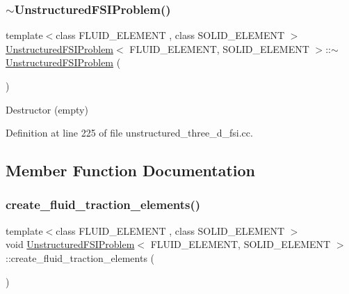 \subsubsection{\texorpdfstring{$\sim$\+Unstructured\+F\+S\+I\+Problem()}{~UnstructuredFSIProblem()}}
{\footnotesize\ttfamily template$<$class F\+L\+U\+I\+D\+\_\+\+E\+L\+E\+M\+E\+NT , class S\+O\+L\+I\+D\+\_\+\+E\+L\+E\+M\+E\+NT $>$ \\
\hyperlink{classUnstructuredFSIProblem}{Unstructured\+F\+S\+I\+Problem}$<$ F\+L\+U\+I\+D\+\_\+\+E\+L\+E\+M\+E\+NT, S\+O\+L\+I\+D\+\_\+\+E\+L\+E\+M\+E\+NT $>$\+::$\sim$\hyperlink{classUnstructuredFSIProblem}{Unstructured\+F\+S\+I\+Problem} (\begin{DoxyParamCaption}{ }\end{DoxyParamCaption})\hspace{0.3cm}{\ttfamily [inline]}}



Destructor (empty) 



Definition at line 225 of file unstructured\+\_\+three\+\_\+d\+\_\+fsi.\+cc.



\subsection{Member Function Documentation}
\mbox{\label{classUnstructuredFSIProblem_af766e3bbc8963a286678cb1d277909f5}} 
\subsubsection{\texorpdfstring{create\+\_\+fluid\+\_\+traction\+\_\+elements()}{create\_fluid\_traction\_elements()}}
{\footnotesize\ttfamily template$<$class F\+L\+U\+I\+D\+\_\+\+E\+L\+E\+M\+E\+NT , class S\+O\+L\+I\+D\+\_\+\+E\+L\+E\+M\+E\+NT $>$ \\
void \hyperlink{classUnstructuredFSIProblem}{Unstructured\+F\+S\+I\+Problem}$<$ F\+L\+U\+I\+D\+\_\+\+E\+L\+E\+M\+E\+NT, S\+O\+L\+I\+D\+\_\+\+E\+L\+E\+M\+E\+NT $>$\+::create\+\_\+fluid\+\_\+traction\+\_\+elements (\begin{DoxyParamCaption}{ }\end{DoxyParamCaption})}



